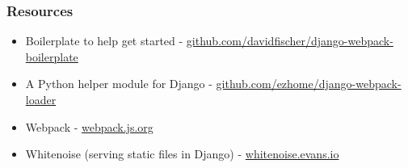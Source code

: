 \documentclass[handout]{beamer}
\begin{document}

\begin{frame}
\frametitle{Resources}
  \begin{itemize}
    \item {\small Boilerplate to help get started - \href{https://github.com/davidfischer/django-webpack-boilerplate}{github.com/davidfischer/django-webpack-boilerplate}}
    \item {\small A Python helper module for Django - \href{https://github.com/ezhome/django-webpack-loader}{github.com/ezhome/django-webpack-loader}}
    \item {\small Webpack - \href{https://webpack.js.org/}{webpack.js.org}}
    \item {\small Whitenoise (serving static files in Django) - \href{http://whitenoise.evans.io/}{whitenoise.evans.io}}
  \end{itemize}
\end{frame}
\end{document}
